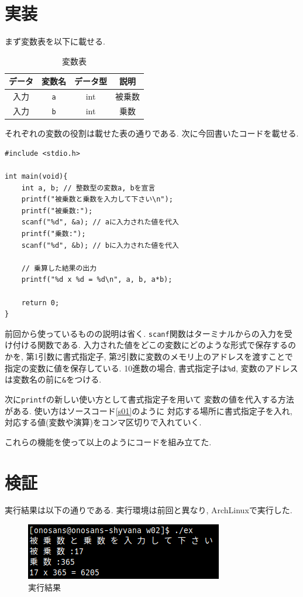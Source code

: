 \documentclass[a4paper, xelatex, ja=standard]{bxjsarticle}
\begin{document}
\section{実装}
まず変数表を以下に載せる.

\begin{table}[h]
\centering
\caption{変数表}
\label{}
\begin{tabular}{|c|c|c|c|}
\hline
データ & 変数名                         & データ型 & 説明  \\ \hline
入力  & \texttt{a} & int  & 被乗数 \\ \hline
入力  & \texttt{b} & int  & 乗数  \\ \hline
\end{tabular}
\end{table}

それぞれの変数の役割は載せた表の通りである.
次に今回書いたコードを載せる.

\begin{lstlisting}[caption=ソースコード,label=s01]
#include <stdio.h>

int main(void){
	int a, b; // 整数型の変数a, bを宣言
	printf("被乗数と乗数を入力して下さい\n");
	printf("被乗数:");
	scanf("%d", &a); // aに入力された値を代入
	printf("乗数:");
	scanf("%d", &b); // bに入力された値を代入

	// 乗算した結果の出力
	printf("%d x %d = %d\n", a, b, a*b);

	return 0;
}
\end{lstlisting}

前回から使っているものの説明は省く.
\texttt{scanf}関数はターミナルからの入力を受け付ける関数である.
入力された値をどこの変数にどのような形式で保存するのかを,
第1引数に書式指定子, 第2引数に変数のメモリ上のアドレスを渡すことで
指定の変数に値を保存している.
10進数の場合, 書式指定子は\texttt{\%d},
変数のアドレスは変数名の前に\texttt{\&}をつける.

次に\texttt{printf}の新しい使い方として書式指定子を用いて
変数の値を代入する方法がある.
使い方はソースコード\ref{s01}のように
対応する場所に書式指定子を入れ,
対応する値(変数や演算)をコンマ区切りで入れていく.

これらの機能を使って以上のようにコードを組み立てた.

\section{検証}
実行結果は以下の通りである.
実行環境は前回と異なり, 
ArchLinuxで実行した.
\begin{figure}[h]
\centering
\includegraphics[scale=1.0]{../img/terminal_result.png}
\caption{実行結果}
\label{}
\end{figure}
\end{document}
